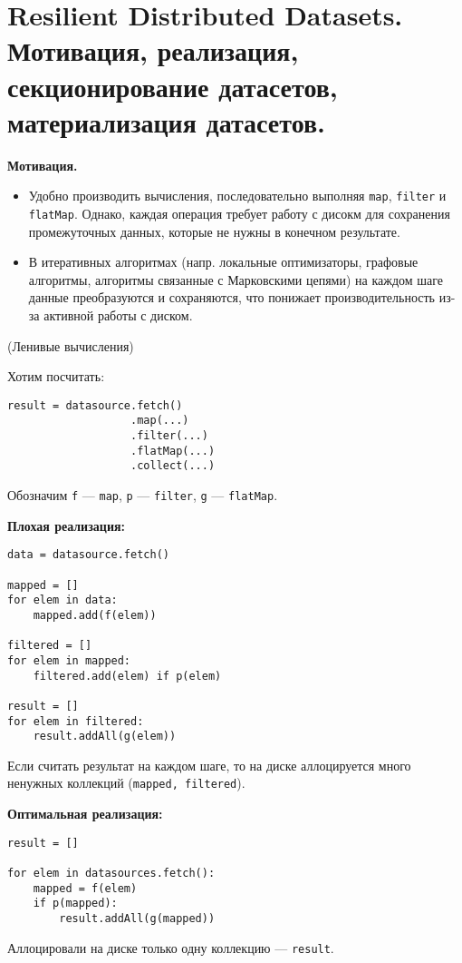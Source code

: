 \section{Resilient Distributed Datasets. Мотивация, реализация,
  секционирование датасетов, материализация датасетов.}

\textbf{Мотивация.}
\begin{itemize}
  \item Удобно производить вычисления, последовательно выполняя \texttt{map},
    \texttt{filter} и \texttt{flatMap}. Однако, каждая операция требует работу с
    дисокм для сохранения промежуточных данных, которые не нужны в конечном
    результате.
  \item В итеративных алгоритмах (напр. локальные оптимизаторы, графовые
    алгоритмы, алгоритмы связанные с Марковскими цепями) на каждом шаге данные
    преобразуются и сохраняются, что понижает производительность из-за активной
    работы с диском.
\end{itemize}


\begin{example}(Ленивые вычисления)

Хотим посчитать:
  \begin{lstlisting}
result = datasource.fetch()
                   .map(...)
                   .filter(...)
                   .flatMap(...)
                   .collect(...)
  \end{lstlisting}

Обозначим \texttt{f} --- \texttt{map}, \texttt{p} --- \texttt{filter}, \texttt{g} --- \texttt{flatMap}.

\textbf{Плохая реализация:}

  \begin{lstlisting}
data = datasource.fetch()

mapped = []
for elem in data:
    mapped.add(f(elem))

filtered = []
for elem in mapped:
    filtered.add(elem) if p(elem)

result = []
for elem in filtered:
    result.addAll(g(elem))
  \end{lstlisting}

  Если считать результат на каждом шаге, то на диске аллоцируется много ненужных коллекций (\texttt{mapped, filtered}).

\textbf{Оптимальная реализация:}
  \begin{lstlisting}
result = []

for elem in datasources.fetch():
    mapped = f(elem)
    if p(mapped):
        result.addAll(g(mapped))
  \end{lstlisting}

Аллоцировали на диске только одну коллекцию --- \texttt{result}.
\end{example}

